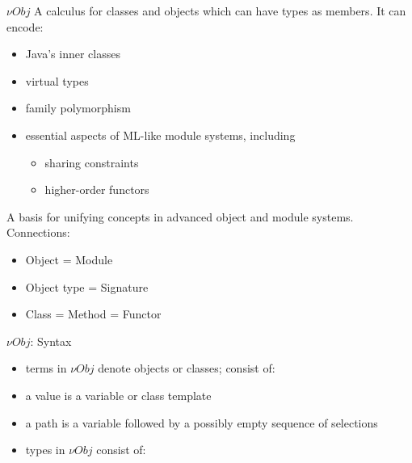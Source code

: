 \documentclass{beamer}
\begin{document}
\begin{frame}{${\nu}Obj$}
A calculus for classes and objects which can have types as members. It can encode:
\begin{itemize}
\item Java's inner classes
\item virtual types
\item family polymorphism
\item essential aspects of ML-like module systems, including
\begin{itemize}
\item sharing constraints
\item higher-order functors
\end{itemize}
\end{itemize}
A basis for unifying concepts  in advanced object and module systems. Connections:
\begin{itemize}
\item Object = Module
\item Object type = Signature
\item Class = Method = Functor
\end{itemize}
\end{frame}

\begin{frame}{${\nu}Obj$: Syntax}
\begin{itemize}
\item terms in ${\nu}Obj$ denote objects or classes; consist of:
\item a value is a variable or class template
\item a path is a variable followed by a possibly empty sequence of selections
\item types in ${\nu}Obj$ consist of:
\end{itemize}
\end{frame}
\end{document}
